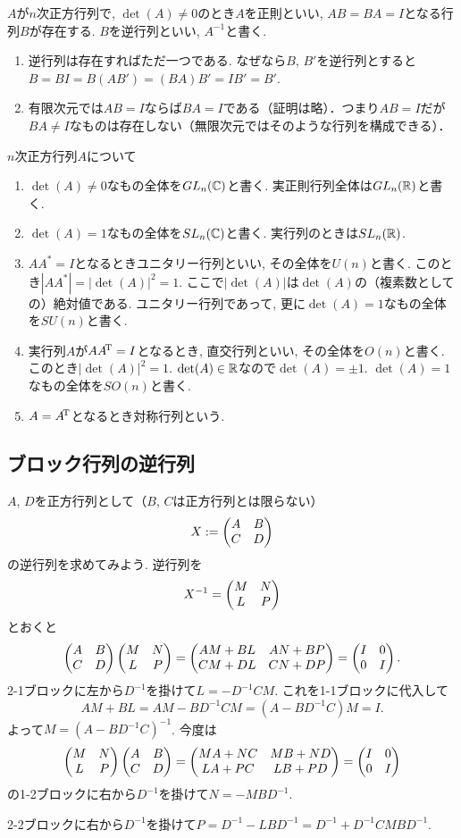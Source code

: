 $A$が$n$次正方行列で, $\det(A)\neq0$のとき$A$を正則といい, $AB=BA=I$となる行列$B$が存在する.
$B$を逆行列といい, $A^{-1}$と書く.

\begin{enumerate}
\item 逆行列は存在すればただ一つである. なぜなら$B$, $B'$を逆行列とすると$B=BI=B(AB')=(BA)B'=IB'=B'$.
\item 有限次元では$AB=I$ならば$BA=I$である（証明は略）．つまり$AB=I$だが$BA\neq I$なものは存在しない（無限次元ではそのような行列を構成できる）．
\end{enumerate}

$n$次正方行列$A$について

\begin{enumerate}
\item $\det(A) \neq 0$なもの全体を$GL_n(\mathbb{C})$と書く. 実正則行列全体は$GL_n(\mathbb{R})$と書く.
\item $\det(A)=1$なもの全体を$SL_n(\mathbb{C})$と書く. 実行列のときは$SL_n(\mathbb{R})$.
\item $AA^*=I$となるときユニタリー行列といい, その全体を$U(n)$と書く. このとき$|AA^*|=|\det(A)|^2=1$.
ここで$|\det(A)|$は$\det(A)$の（複素数としての）絶対値である.
ユニタリー行列であって, 更に$\det(A)=1$なもの全体を$SU(n)$と書く.
\item 実行列$A$が$A{A}^{\!\mathrm{T}}=I$となるとき, 直交行列といい, その全体を$O(n)$と書く. このとき$|\det(A)|^2=1$.
$\det(A) \in \mathbb{R}$なので$\det(A)=\pm 1$.
$\det(A)=1$なもの全体を$SO(n)$と書く.
\item $A={A}^{\!\mathrm{T}}$となるとき対称行列という.
\end{enumerate}
\vspace{0pt}

\subsection{ブロック行列の逆行列}

$A$, $D$を正方行列として（$B$, $C$は正方行列とは限らない）
$$
X:=\begin{pmatrix} A & B \\ C & D \end{pmatrix}
$$
の逆行列を求めてみよう.
逆行列を
$$
X^{-1}=\begin{pmatrix} M & N \\ L & P \end{pmatrix}
$$
とおくと
$$
\begin{pmatrix} A & B \\ C & D \end{pmatrix} \begin{pmatrix} M & N \\ L & P \end{pmatrix}=\begin{pmatrix} AM+BL & AN+BP \\ CM+DL & CN+DP \end{pmatrix}=\begin{pmatrix} I & 0 \\ 0 & I \end{pmatrix}.
$$
2-1ブロックに左から$D^{-1}$を掛けて$L=-D^{-1}CM$.
これを1-1ブロックに代入して
$$
AM+BL=AM-BD^{-1}CM=(A-BD^{-1}C)M=I.
$$
よって$M=(A-BD^{-1}C)^{-1}$.
今度は
$$\begin{pmatrix} M & N \\ L & P \end{pmatrix} \begin{pmatrix} A & B \\ C & D \end{pmatrix}=\begin{pmatrix} MA+NC & MB+ND \\ LA+PC & LB+PD \end{pmatrix}=\begin{pmatrix} I & 0 \\ 0 & I \end{pmatrix}$$
の1-2ブロックに右から$D^{-1}$を掛けて$N=-MBD^{-1}$.

2-2ブロックに右から$D^{-1}$を掛けて$P=D^{-1}-LBD^{-1}=D^{-1}+D^{-1}CMBD^{-1}$.

